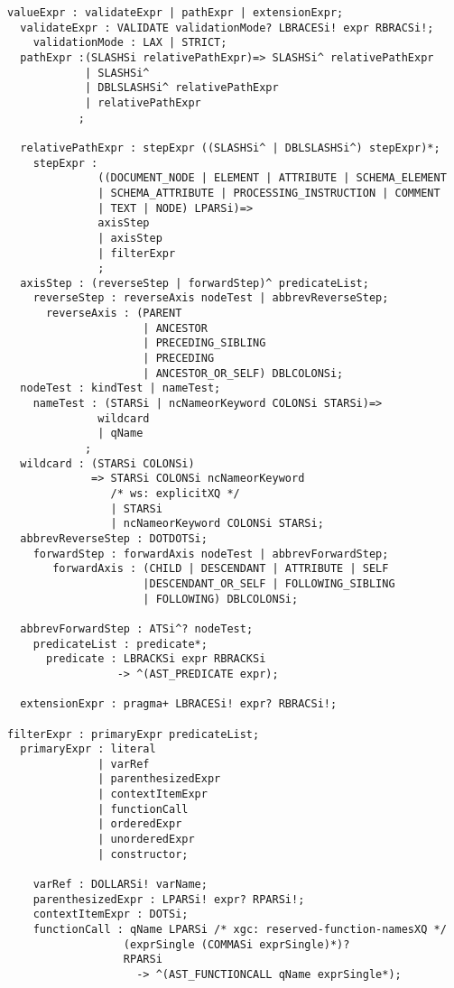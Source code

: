 \begin{verbatim}
valueExpr : validateExpr | pathExpr | extensionExpr;
  validateExpr : VALIDATE validationMode? LBRACESi! expr RBRACSi!;
    validationMode : LAX | STRICT;
  pathExpr :(SLASHSi relativePathExpr)=> SLASHSi^ relativePathExpr
            | SLASHSi^
            | DBLSLASHSi^ relativePathExpr
            | relativePathExpr
           ;

  relativePathExpr : stepExpr ((SLASHSi^ | DBLSLASHSi^) stepExpr)*;
    stepExpr :
              ((DOCUMENT_NODE | ELEMENT | ATTRIBUTE | SCHEMA_ELEMENT 
              | SCHEMA_ATTRIBUTE | PROCESSING_INSTRUCTION | COMMENT 
              | TEXT | NODE) LPARSi)=> 
              axisStep
              | axisStep
              | filterExpr
              ;
  axisStep : (reverseStep | forwardStep)^ predicateList;
    reverseStep : reverseAxis nodeTest | abbrevReverseStep;
      reverseAxis : (PARENT 
                     | ANCESTOR 
                     | PRECEDING_SIBLING 
                     | PRECEDING 
                     | ANCESTOR_OR_SELF) DBLCOLONSi;
  nodeTest : kindTest | nameTest;
    nameTest : (STARSi | ncNameorKeyword COLONSi STARSi)=>
              wildcard
              | qName 
            ;
  wildcard : (STARSi COLONSi) 
             => STARSi COLONSi ncNameorKeyword
                /* ws: explicitXQ */
                | STARSi
                | ncNameorKeyword COLONSi STARSi;
  abbrevReverseStep : DOTDOTSi;
    forwardStep : forwardAxis nodeTest | abbrevForwardStep;
       forwardAxis : (CHILD | DESCENDANT | ATTRIBUTE | SELF 
                     |DESCENDANT_OR_SELF | FOLLOWING_SIBLING 
                     | FOLLOWING) DBLCOLONSi;

  abbrevForwardStep : ATSi^? nodeTest;
    predicateList : predicate*;
      predicate : LBRACKSi expr RBRACKSi
                 -> ^(AST_PREDICATE expr);

  extensionExpr : pragma+ LBRACESi! expr? RBRACSi!; 

filterExpr : primaryExpr predicateList;
  primaryExpr : literal 
              | varRef 
              | parenthesizedExpr 
              | contextItemExpr 
              | functionCall 
              | orderedExpr 
              | unorderedExpr 
              | constructor;

    varRef : DOLLARSi! varName;
    parenthesizedExpr : LPARSi! expr? RPARSi!;
    contextItemExpr : DOTSi;
    functionCall : qName LPARSi /* xgc: reserved-function-namesXQ */
                  (exprSingle (COMMASi exprSingle)*)? 
                  RPARSi
                    -> ^(AST_FUNCTIONCALL qName exprSingle*);


\end{verbatim}
